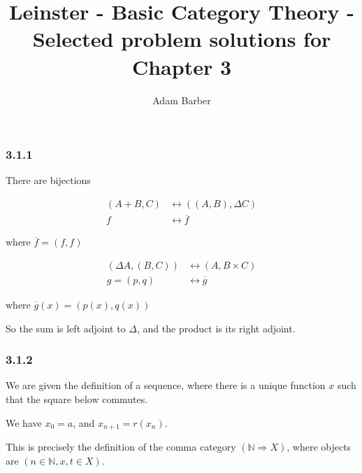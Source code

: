 \documentclass{article}
\begin{document}
\title{Leinster - Basic Category Theory - Selected problem solutions for Chapter 3}
\author{Adam Barber}

\maketitle

\subsubsection*{3.1.1}

There are bijections

\begin{align*}
  (A + B, C) &\leftrightarrow ((A,B), \Delta C) \\
  f &\leftrightarrow \overline{f}
\end{align*}

where $\overline{f} = (f,f)$

\begin{align*}
  (\Delta A, (B, C)) &\leftrightarrow (A, B \times C) \\
  g = (p,q) &\leftrightarrow \overline{g}
\end{align*}

where $\overline{g}(x) = (p(x), q(x))$

So the sum is left adjoint to $\Delta$, and the product is its right adjoint.

\subsubsection*{3.1.2}

We are given the definition of a sequence, where there is a unique function $x$ such that the square below commutes.

We have $x_0 = a$, and $x_{n+1} = r(x_n)$.

\begin{center}
\end{center}

This is precisely the definition of the comma category $(\mathds{N} \Rightarrow X)$, where objects are $(n \in \mathds{N}, x, t \in X)$.
\end{document}
